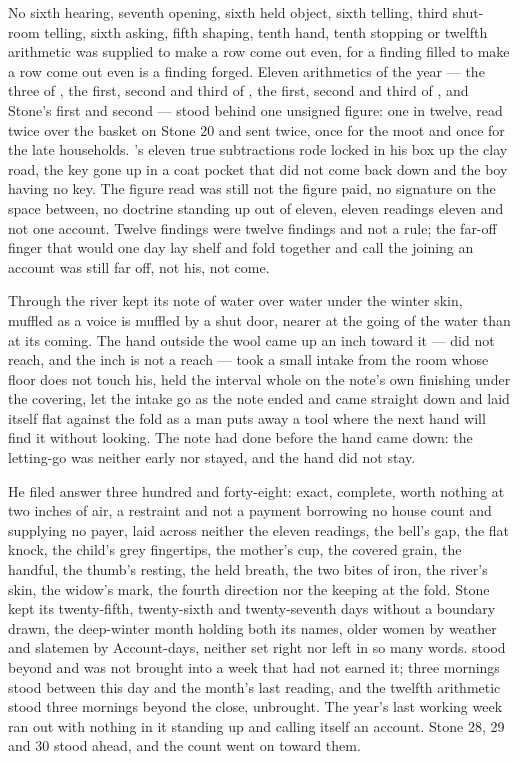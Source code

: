 No sixth hearing, seventh opening, sixth held object, sixth telling, third shut-room telling, sixth asking, fifth shaping, tenth hand, tenth stopping or twelfth arithmetic was supplied to make a row come out even, for a finding filled to make a row come out even is a finding forged. Eleven arithmetics of the year --- the three of , the first, second and third of , the first, second and third of , and Stone's first and second --- stood behind one unsigned figure: one in twelve, read twice over the basket on Stone 20 and sent twice, once for the moot and once for the late households. 's eleven true subtractions rode locked in his box up the clay road, the key gone up in a coat pocket that did not come back down and the boy having no key. The figure read was still not the figure paid, no signature on the space between, no doctrine standing up out of eleven, eleven readings eleven and not one account. Twelve findings were twelve findings and not a rule; the far-off finger that would one day lay shelf and fold together and call the joining an account was still far off, not his, not come.

Through  the river kept its note of water over water under the winter skin, muffled as a voice is muffled by a shut door, nearer at the going of the water than at its coming. The hand outside the wool came up an inch toward it --- did not reach, and the inch is not a reach --- took a small intake from the room whose floor does not touch his, held the interval whole on the note's own finishing under the covering, let the intake go as the note ended and came straight down and laid itself flat against the fold as a man puts away a tool where the next hand will find it without looking. The note had done before the hand came down: the letting-go was neither early nor stayed, and the hand did not stay.

He filed answer three hundred and forty-eight: exact, complete, worth nothing at two inches of air, a restraint and not a payment borrowing no house count and supplying no payer, laid across neither the eleven readings, the bell's gap, the flat knock, the child's grey fingertips, the mother's cup, the covered grain, the handful, the thumb's resting, the held breath, the two bites of iron, the river's skin, the widow's mark, the fourth direction nor the keeping at the fold. Stone kept its twenty-fifth, twenty-sixth and twenty-seventh days without a boundary drawn, the deep-winter month holding both its names, older women by weather and slatemen by  Account-days, neither set right nor left in so many words.  stood beyond and was not brought into a week that had not earned it; three mornings stood between this day and the month's last reading, and the twelfth arithmetic stood three mornings beyond the close, unbrought. The year's last working week ran out with nothing in it standing up and calling itself an account. Stone 28, 29 and 30 stood ahead, and the count went on toward them.

